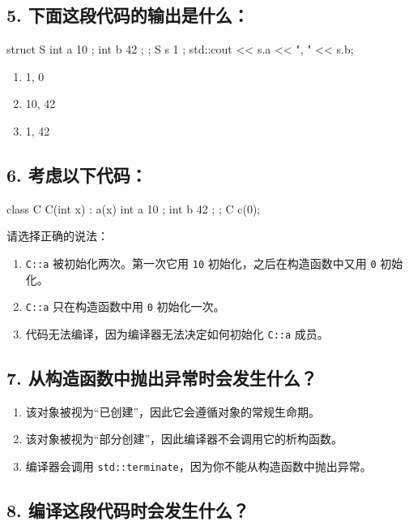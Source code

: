 \subsection{5. 下面这段代码的输出是什么：}

\begin{codebox}[cpp]
struct S {
int a { 10 };
int b { 42 };
};
S s { 1 };
std::cout << s.a << ", " << s.b;
\end{codebox}

\begin{enumerate}
\item 1, 0
\item 10, 42
\item 1, 42
\end{enumerate}

\subsection{6. 考虑以下代码：}

\begin{codebox}[cpp]
class C {
C(int x) : a(x) { }
int a { 10 };
int b { 42 };
};
C c(0);
\end{codebox}

请选择正确的说法：

\begin{enumerate}
\item \texttt{C::a} 被初始化两次。第一次它用 \texttt{10} 初始化，之后在构造函数中又用 \texttt{0} 初始化。
\item \texttt{C::a} 只在构造函数中用 \texttt{0} 初始化一次。
\item 代码无法编译，因为编译器无法决定如何初始化 \texttt{C::a} 成员。
\end{enumerate}

\subsection{7. 从构造函数中抛出异常时会发生什么？}

\begin{enumerate}
\item 该对象被视为“已创建”，因此它会遵循对象的常规生命期。
\item 该对象被视为“部分创建”，因此编译器不会调用它的析构函数。
\item 编译器会调用 \texttt{std::terminate}，因为你不能从构造函数中抛出异常。
\end{enumerate}

\subsection{8. 编译这段代码时会发生什么？}

